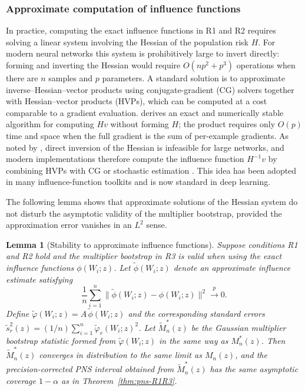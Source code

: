 \documentclass[accepted]{uai2026} %
\theoremstyle{plain}
\newtheorem{lemma}[theorem]{Lemma}
\theoremstyle{definition}
\theoremstyle{remark}
\begin{document}
\subsubsection{Approximate computation of influence functions}
\label{subsubsec:approx-inf}

In practice, computing the exact influence functions in R1 and R2 requires
solving a linear system involving the Hessian of the population risk $H$.
For modern neural networks this system is prohibitively large to invert
directly: forming and inverting the Hessian would require $O(np^2 + p^3)$
operations when there are $n$ samples and $p$ parameters.  A standard
solution is to approximate inverse--Hessian--vector products using
conjugate-gradient (CG) solvers together with Hessian--vector products
(HVPs), which can be computed at a cost comparable to a gradient evaluation.
\citep{pearlmutter1994} derives an exact and numerically stable algorithm for
computing $H v$ without forming $H$; the product requires only $O(p)$ time and
space when the full gradient is the sum of per-example gradients.  As noted
by \citep{kohliang2017, pearlmutter1994, martens2010}, direct inversion of the Hessian is
infeasible for large networks, and modern implementations therefore compute
the influence function $H^{-1}v$ by combining HVPs with CG or stochastic
estimation \citep{martens2010,kohliang2017}.  This idea has been adopted in
many influence-function toolkits and is now standard in deep learning.

The following lemma shows that approximate solutions of the Hessian system do
not disturb the asymptotic validity of the multiplier bootstrap, provided
the approximation error vanishes in an $L^2$ sense.

\begin{lemma}[Stability to approximate influence functions]
\label{lem:approx}
Suppose conditions R1 and R2 hold and the multiplier bootstrap in R3 is
valid when using the exact influence functions $\phi(W_i;z)$.  Let
$\tilde\phi(W_i;z)$ denote an approximate influence estimate satisfying
\begin{equation}
\label{eq:approx-L2}
    \frac{1}{n}\sum_{i=1}^n\|\tilde\phi(W_i;z)-\phi(W_i;z)\|^2 \xrightarrow{p} 0.
\end{equation}
Define $\tilde\varphi(W_i;z) = A\,\tilde\phi(W_i;z)$ and the corresponding
standard errors $\tilde s_r^2(z) = (1/n)\sum_{i=1}^n \tilde\varphi_r(W_i;z)^2$.
Let $\tilde M_n^*(z)$ be the Gaussian multiplier bootstrap statistic formed
from $\tilde\varphi(W_i;z)$ in the same way as $M_n^*(z)$. Then
$\tilde M_n^*(z)$ converges in distribution to the same limit as $M_n(z)$,
and the precision-corrected PNS interval obtained from $\tilde M_n^*(z)$ has
the same asymptotic coverage $1-\alpha$ as in
Theorem~\ref{thm:pns-R1R3}.
\end{lemma}
\end{document}
